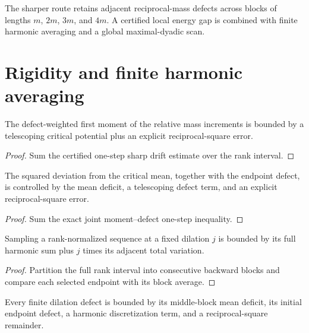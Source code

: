 The sharper route retains adjacent reciprocal-mass defects across blocks of
lengths $m$, $2m$, $3m$, and $4m$.  A certified local energy gap is combined
with finite harmonic averaging and a global maximal-dyadic scan.

\section{Rigidity and finite harmonic averaging}

\begin{lemma}
  \label{lem:sharp-rigidity}
  \leanok
  The defect-weighted first moment of the relative mass increments is bounded
  by a telescoping critical potential plus an explicit reciprocal-square
  error.
\end{lemma}

\begin{proof}
  \leanok
  Sum the certified one-step sharp drift estimate over the rank interval.
\end{proof}

\begin{lemma}
  \label{lem:moment-rigidity}
  \leanok
  The squared deviation from the critical mean, together with the endpoint
  defect, is controlled by the mean deficit, a telescoping defect term, and
  an explicit reciprocal-square error.
\end{lemma}

\begin{proof}
  \leanok
  Sum the exact joint moment--defect one-step inequality.
\end{proof}

\begin{lemma}
  \label{lem:fixed-dilation-sampling}
  \leanok
  Sampling a rank-normalized sequence at a fixed dilation $j$ is bounded by
  its full harmonic sum plus $j$ times its adjacent total variation.
\end{lemma}

\begin{proof}
  \leanok
  Partition the full rank interval into consecutive backward blocks and
  compare each selected endpoint with its block average.
\end{proof}

\begin{lemma}
  \label{lem:dilation-defect}
  \leanok
  Every finite dilation defect is bounded by its middle-block mean deficit,
  its initial endpoint defect, a harmonic discretization term, and a
  reciprocal-square remainder.
\end{lemma}


